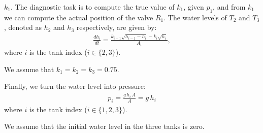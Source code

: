 $k_1$. The diagnostic task is to compute the true value of $k_1$,
given $p_1$, and from $k_1$ we can compute the actual position of the
valve $R_1$.
%
The water levels of $T_2$ and $T_3$, denoted as $h_2$ and $h_3$
respectively, are given by:
%
\begin{eqnarray}\label{eq:tank1}
%
\frac{d h_i}{dt} = \frac{k_{i - 1} \sqrt{h_{i - 1} - h_i} - k_i \sqrt{h_i}}{A_i},
%
\end{eqnarray}
%
where $i$ is the tank index ($i \in \{2, 3\}$).
\par
We assume that $k_1 = k_2 = k_3 = 0.75$.
\par
Finally, we turn the water level into pressure:
\begin{eqnarray}
p_i = \frac{g\,h_i\,A}{A} = g\,h_i\label{eq:pressure}
\end{eqnarray}
where $i$ is the tank index ($i \in \{1, 2, 3\}$).
\par
We assume that the initial water level in the three tanks is zero.